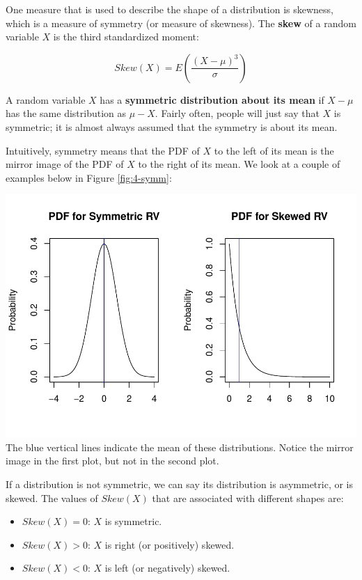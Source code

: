 \documentclass[
]{book}
\providecommand{\tightlist}{%
  \setlength{\itemsep}{0pt}\setlength{\parskip}{0pt}}
\begin{document}
One measure that is used to describe the shape of a distribution is skewness, which is a measure of symmetry (or measure of skewness). The \textbf{skew} of a random variable \(X\) is the third standardized moment:

\begin{equation} 
Skew(X) = E \left(\frac{(X-\mu)^3}{\sigma} \right)
\label{eq:4-skew}
\end{equation}

A random variable \(X\) has a \textbf{symmetric distribution about its mean} if \(X - \mu\) has the same distribution as \(\mu - X\). Fairly often, people will just say that \(X\) is symmetric; it is almost always assumed that the symmetry is about its mean.

Intuitively, symmetry means that the PDF of \(X\) to the left of its mean is the mirror image of the PDF of \(X\) to the right of its mean. We look at a couple of examples below in Figure \ref{fig:4-symm}:

\includegraphics{bookdown-demo_files/figure-latex/4-symm-1.pdf}
The blue vertical lines indicate the mean of these distributions. Notice the mirror image in the first plot, but not in the second plot.

If a distribution is not symmetric, we can say its distribution is asymmetric, or is skewed. The values of \(Skew(X)\) that are associated with different shapes are:

\begin{itemize}
\tightlist
\item
  \(Skew(X) = 0\): \(X\) is symmetric.
\item
  \(Skew(X) > 0\): \(X\) is right (or positively) skewed.
\item
  \(Skew(X) < 0\): \(X\) is left (or negatively) skewed.
\end{itemize}
\end{document}
